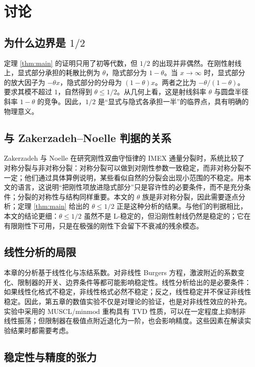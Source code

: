 \section{讨论}
\label{sec:discussion}

\subsection{为什么边界是 \texorpdfstring{$1/2$}{1/2}}

定理 \ref{thm:main} 的证明只用了初等代数，但 $1/2$ 的出现并非偶然。在刚性射线上，显式部分承担的耗散比例为 $\theta$，隐式部分为 $1-\theta$。当 $x\to\infty$ 时，显式部分的放大因子为 $-\theta x$，隐式部分的分母为 $(1-\theta)x$。两者之比为 $-\theta/(1-\theta)$。要求其模不超过 $1$，自然得到 $\theta\le1/2$。从几何上看，这是射线斜率 $\theta$ 与圆盘半径斜率 $1-\theta$ 的竞争。因此，$1/2$ 是“显式与隐式各承担一半”的临界点，具有明确的物理意义。

\subsection{与 Zakerzadeh--Noelle 判据的关系}

Zakerzadeh 与 Noelle 在研究刚性双曲守恒律的 IMEX 通量分裂时，系统比较了对称分裂与非对称分裂：对称分裂可以做到对刚性参数一致稳定，而非对称分裂不一定；他们通过具体算例说明，某些看似自然的分裂会出现小范围的不稳定\cite{zakerzadeh2018}。用本文的语言，这说明“把刚性项放进隐式部分”只是容许性的必要条件，而不是充分条件；分裂的对称性与结构同样重要。本文的 $\theta$ 族是非对称分裂，因此需要逐点分析；定理 \ref{thm:main} 给出的 $\theta\le1/2$ 正是这种分析的结果。与他们的判据相比，本文的结论更细：$\theta\le1/2$ 虽然不是 L-稳定的，但沿刚性射线仍然是稳定的；它在有限刚性下可用，只是在极强的刚性下会留下不衰减的残余模态。

\subsection{线性分析的局限}

本章的分析基于线性化与冻结系数。对非线性 Burgers 方程，激波附近的系数变化、限制器的开关、边界条件等都可能影响稳定性。线性分析给出的是必要条件：如果线性化格式不稳定，非线性格式必然不稳定；反之，线性稳定并不保证非线性稳定。因此，第五章的数值实验不仅是对理论的验证，也是对非线性效应的补充。实验中采用的 MUSCL/minmod 重构具有 TVD 性质，可以在一定程度上抑制非线性振荡；但限制器在极值点附近退化为一阶，也会影响精度。这些因素在解读实验结果时都需要考虑。

\subsection{稳定性与精度的张力}

